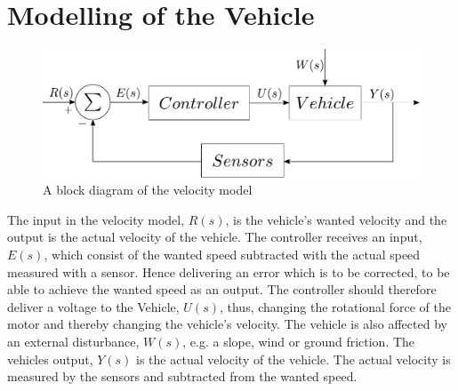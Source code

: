 \chapter{Modelling of the Vehicle}\label{cha:ModelOfVehicle}

\begin{figure}[H]
	\centering
	\includegraphics[scale=0.6]{figures/StartTotalModelsystem.pdf}
	\caption{A block diagram of the velocity model}
	\label{fig:StartTotalModelsystem}
\end{figure}

The input in the velocity model, $R(s)$, is the vehicle's wanted velocity and the output is the actual velocity of the vehicle. The controller receives an input, $E(s)$, which consist of the wanted speed subtracted with the actual speed measured with a sensor. Hence delivering an error which is to be corrected, to be able to achieve the wanted speed as an output. The controller should therefore deliver a voltage to the Vehicle, $U(s)$, thus, changing the rotational force of the motor and thereby changing the vehicle's velocity. The vehicle is also affected by an external disturbance, $W(s)$, e.g. a slope, wind or ground friction. The vehicles output, $Y(s)$ is the actual velocity of the vehicle. The actual velocity is measured by the sensors and subtracted from the wanted speed.

